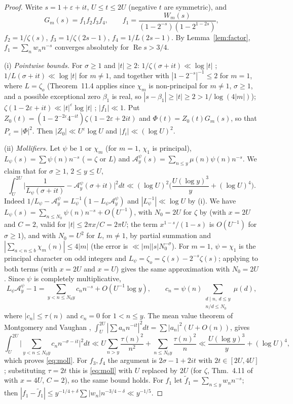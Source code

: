 \documentclass[11pt]{amsart}
\theoremstyle{remark}
\newcommand{\zo}{\zeta_{o}}
\newcommand{\cA}{\mathcal{A}}
\begin{document}
\begin{proof}
Write $s=1+\varepsilon+it$, $U\le t\le2U$ (negative $t$ are symmetric), and
\[
G_m(s)=f_1f_2f_3f_4,\qquad f_1=\frac{W_m(s)}{(1-2^{-s})(1-2^{1-2s})},
\]
$f_2=1/\zeta(s)$, $f_3=1/\zeta(2s-1)$, $f_4=1/L(2s-1)$.
By Lemma~\ref{lem:factor}, $f_1=\sum_nw_nn^{-s}$ converges absolutely for $\operatorname{Re}s>3/4$.

(i) \emph{Pointwise bounds.} For $\sigma\ge1$ and $|t|\ge2$: $1/\zeta(\sigma+it)\ll\log|t|$ \cite[\S3.6]{T}; $1/L(\sigma+it)\ll\log|t|$ \cite[Thm.~11.4, (11.7)]{MVb} for $m\ne1$, and \cite[\S3.6]{T} together with $|1-2^{-s}|^{-1}\le2$ for $m=1$, where $L=\zo$ (Theorem~11.4 applies since $\chi_m$ is non-principal for $m\ne1$, $\sigma\ge1$, and a possible exceptional zero $\beta_1$ is real, so $|s-\beta_1|\ge|t|\ge2>1/\log(4|m|)$); $\zeta(1-2\varepsilon+it)\ll|t|^{\varepsilon}\log|t|$ \cite[\S5.1]{T}; $|f_1|\ll1$. Put $Z_0(t)=(1-2^{-2\varepsilon}4^{-it})\zeta(1-2\varepsilon+2it)$ and $\Phi(t)=Z_0(t)G_m(s)$, so that $P_\varepsilon=|\Phi|^2$. Then $|Z_0|\ll U^{\varepsilon}\log U$ and $|f_i|\ll(\log U)^{2}$.

(ii) \emph{Mollifiers.} Let $\psi$ be $1$ or $\chi_m$ (for $m=1$, $\chi_1$ is principal), $L_\psi(s)=\sum\psi(n)n^{-s}$ ($=\zeta$ or $L$) and $\cA_y^\psi(s)=\sum_{n\le y}\mu(n)\psi(n)n^{-s}$. We claim that for $\sigma\ge1$, $2\le y\le U$,
\begin{equation}\label{eq:moll}
\int_U^{2U}\Big|\frac1{L_\psi(\sigma+it)}-\cA_y^\psi(\sigma+it)\Big|^2dt\ll(\log U)^2\Big(\frac{U(\log y)^3}{y}+(\log U)^4\Big).
\end{equation}
Indeed $1/L_\psi-\cA^\psi_y=L_\psi^{-1}(1-L_\psi\cA^\psi_y)$ and $|L_\psi^{-1}|\ll\log U$ by (i). We have $L_\psi(s)=\sum_{n\le N_0}\psi(n)n^{-s}+O(U^{-1})$, with $N_0=2U$ for $\zeta$ by \cite[Thm.~4.11]{T} (with $x=2U$ and $C=2$, valid for $|t|\le2\pi x/C=2\pi U$; the term $x^{1-s}/(1-s)$ is $O(U^{-1})$ for $\sigma\ge1$), and with $N_0=U^2$ for $L$, $m\ne1$, by partial summation and $|\sum_{a<n\le b}\chi_m(n)|\le4|m|$ (the error is $\ll|m||s|N_0^{-\sigma}$). For $m=1$, $\psi=\chi_1$ is the principal character on odd integers and $L_\psi=\zo=\zeta(s)-2^{-s}\zeta(s)$; applying \cite[Thm.~4.11]{T} to both terms (with $x=2U$ and $x=U$) gives the same approximation with $N_0=2U$. Since $\psi$ is completely multiplicative,
\[
L_\psi\cA^\psi_y-1=\sum_{y<n\le N_0y}c_nn^{-s}+O(U^{-1}\log y),\qquad c_n=\psi(n)\sum_{\substack{d\mid n,\ d\le y\\ n/d\le N_0}}\mu(d),
\]
where $|c_n|\le\tau(n)$ and $c_n=0$ for $1<n\le y$. The mean value theorem of Montgomery and Vaughan \cite{MV}, $\int_U^{2U}|\sum a_nn^{-it}|^2dt=\sum|a_n|^2(U+O(n))$, gives
\[
\int_U^{2U}\Big|\sum_{y<n\le N_0y}c_nn^{-\sigma-it}\Big|^2dt\ll U\sum_{n>y}\frac{\tau(n)^2}{n^2}+\sum_{n\le N_0y}\frac{\tau(n)^2}{n}\ll\frac{U(\log y)^3}{y}+(\log U)^4,
\]
which proves \eqref{eq:moll}. For $f_3,f_4$ the argument is $2\sigma-1+2it$ with $2t\in[2U,4U]$; substituting $\tau=2t$ this is \eqref{eq:moll} with $U$ replaced by $2U$ (for $\zeta$, Thm.~4.11 of \cite{T} with $x=4U$, $C=2$), so the same bound holds. For $f_1$ let $\tilde f_1=\sum_{n\le y}w_nn^{-s}$; then $|f_1-\tilde f_1|\le y^{-1/4+\delta}\sum|w_n|n^{-3/4-\delta}\ll y^{-1/5}$.


\end{proof}
\end{document}
